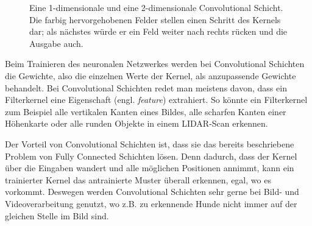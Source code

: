 \documentclass[10pt]{article}
\newcommand{\eng}[1]{\textit{#1}}
\begin{document}
\begin{figure}[h!]
{
    }
    \caption{Eine 1-dimensionale und eine 2-dimensionale Convolutional Schicht. Die farbig hervorgehobenen Felder stellen einen Schritt des Kernels dar; als nächstes würde er ein Feld weiter nach rechts rücken und die Ausgabe auch.} %
    \label{fig:conv_layers}
\end{figure}

Beim Trainieren des neuronalen Netzwerkes werden bei Convolutional Schichten die Gewichte, also die einzelnen Werte der Kernel, als anzupassende Gewichte behandelt.
Bei Convolutional Schichten redet man meistens davon, dass ein Filterkernel eine Eigenschaft (engl. \eng{feature}) extrahiert.
So könnte ein Filterkernel zum Beispiel alle vertikalen Kanten eines Bildes, alle scharfen Kanten einer Höhenkarte oder alle runden Objekte in einem LIDAR-Scan erkennen.

Der Vorteil von Convolutional Schichten ist, dass sie das bereits beschriebene Problem von Fully Connected Schichten lösen.
Denn dadurch, dass der Kernel über die Eingaben wandert und alle möglichen Positionen annimmt, kann ein trainierter Kernel das antrainierte Muster überall erkennen, egal, wo es vorkommt.
Deswegen werden Convolutional Schichten sehr gerne bei Bild- und Videoverarbeitung genutzt, wo z.B. zu erkennende Hunde nicht immer auf der gleichen Stelle im Bild sind. %

\end{document}
